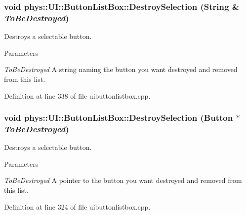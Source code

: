 \hypertarget{classphys_1_1UI_1_1ButtonListBox_a2717ab6e1ad39bb7db634a97c4f4157a}{
\subsubsection[{DestroySelection}]{\setlength{\rightskip}{0pt plus 5cm}void phys::UI::ButtonListBox::DestroySelection ({\bf String} \& {\em ToBeDestroyed})}}
\label{d4/dd7/classphys_1_1UI_1_1ButtonListBox_a2717ab6e1ad39bb7db634a97c4f4157a}


Destroys a selectable button. 


\begin{DoxyParams}{Parameters}
\item[{\em ToBeDestroyed}]A string naming the button you want destroyed and removed from this list. \end{DoxyParams}


Definition at line 338 of file uibuttonlistbox.cpp.

\hypertarget{classphys_1_1UI_1_1ButtonListBox_a4ac91d2219d9fa471976bd482dc909b4}{
\subsubsection[{DestroySelection}]{\setlength{\rightskip}{0pt plus 5cm}void phys::UI::ButtonListBox::DestroySelection ({\bf Button} $\ast$ {\em ToBeDestroyed})}}
\label{d4/dd7/classphys_1_1UI_1_1ButtonListBox_a4ac91d2219d9fa471976bd482dc909b4}


Destroys a selectable button. 


\begin{DoxyParams}{Parameters}
\item[{\em ToBeDestroyed}]A pointer to the button you want destroyed and removed from this list. \end{DoxyParams}


Definition at line 324 of file uibuttonlistbox.cpp.

